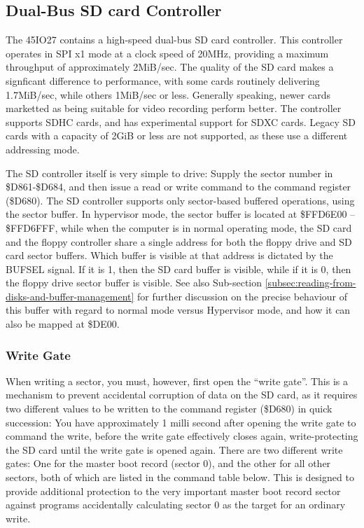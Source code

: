 \subsection{Dual-Bus SD card Controller}

The 45IO27 contains a high-speed dual-bus SD card controller.  This
controller operates in SPI x1 mode at a clock speed of 20MHz,
providing a maximum throughput of approximately 2MiB/sec.  The quality
of the SD card makes a signficant difference to performance, with some
cards routinely delivering 1.7MiB/sec, while others 1MiB/sec or
less. Generally speaking, newer cards marketted as being suitable for
video recording perform better.  The controller supports SDHC cards,
and has experimental support for SDXC cards.  Legacy SD cards with a
capacity of 2GiB or less are not supported, as these use a different
addressing mode.

The SD controller itself is very simple to drive: Supply the sector
number in \$D861-\$D684, and then issue a read or write command to the
command register (\$D680).  The SD controller supports only
sector-based buffered operations, using the sector buffer. In
hypervisor mode, the sector buffer is located at \$FFD6E00 --
\$FFD6FFF, while when the computer is in normal operating mode, the SD
card and the floppy controller share a single address for both the
floppy drive and SD card sector buffers. Which buffer is visible at
that address is dictated by the BUFSEL signal. If it is 1, then the SD
card buffer is visible, while if it is 0, then the floppy drive sector
buffer is visible.  See also Sub-section
\vref{subsec:reading-from-disks-and-buffer-management} for further
discussion on the precise behaviour of this buffer with regard to
normal mode versus Hypervisor mode, and how it can also be mapped at
\$DE00. 

\subsubsection{Write Gate}

When writing a sector, you must, however, first open the ``write
gate''. This is a mechanism to prevent accidental corruption of data
on the SD card, as it requires two different values to be written to
the command register (\$D680) in quick succession: You have
approximately 1 milli second after opening the write gate to command
the write, before the write gate effectively closes again,
write-protecting the SD card until the write gate is opened again.
There are two different write gates: One for the master boot record
(sector 0), and the other for all other sectors, both of which are
listed in the command table below. This is designed to provide
additional protection to the very important master boot record sector
against programs accidentally calculating sector 0 as the target for
an ordinary write.

